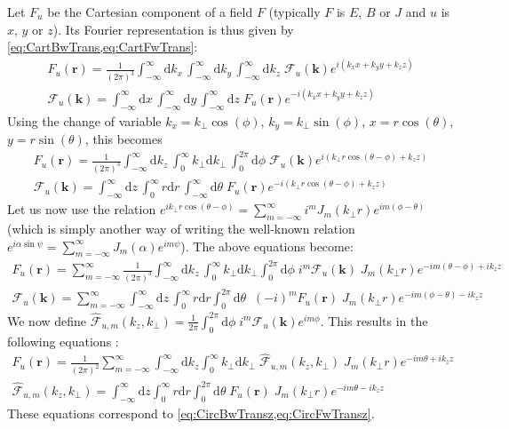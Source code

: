 \documentclass[1p,times]{elsarticle}
\newcommand{\Integ}[1]{\int_{-\infty}^{\infty} \!\!\!\!\!\!
  \mathrm{d}#1}
\newcommand{\RInteg}[1]{\int_{0}^{\infty} \!\!\!\!\! #1\mathrm{d}#1}
\newcommand{\TInteg}[1]{\int_{0}^{2\pi} \!\!\!\!\!\! \mathrm{d}#1}
\renewcommand{\vec}[1]{\boldsymbol{#1}}
\newcommand{\spectral}[1]{\hat{\mathcal{#1}}}
\begin{document}
Let $F_u$ be the Cartesian component of a field $F$ 
(typically $F$ is $E$, $B$ or $J$ and $u$ is $x$, $y$ or $z$). Its Fourier representation
is thus given by \cref{eq:CartBwTrans,eq:CartFwTrans}:
\begin{align}
F_u(\vec{r}) = \frac{1}{(2\pi)^{3}}\Integ{k_x} \,\Integ{k_y}\,
\Integ{k_z} \; \mathcal{F}_u(\vec{k}) e^{i(k_x x + k_y y + k_z z)} \\
\mathcal{F}_u(\vec{k})  = \Integ{x} \,\Integ{y}\,
\Integ{z} \; F_u(\vec{r}) e^{-i(k_x x + k_y y + k_z z)} 
\end{align}
Using the change of variable $k_x=k_\perp\cos(\phi)$, $k_y = k_\perp\sin(\phi)$,
$x=r\cos(\theta)$, $y=r\sin(\theta)$, this becomes
 \begin{align}
F_u(\vec{r}) = \frac{1}{(2\pi)^{3}}\Integ{k_z} \,\RInteg{k_\perp}\,
\TInteg{\phi} \; \mathcal{F}_u(\vec{k})
e^{i(k_\perp r \cos(\theta-\phi) + k_z z)} \\
\mathcal{F}_u(\vec{k})   = \Integ{z} \,\RInteg{r}\,
\Integ{\theta} \; F_u(\vec{r}) e^{-i(k_\perp r \cos(\theta-\phi) + k_z z)} 
\end{align}
Let us now use the relation $e^{ik_\perp r\cos(\theta-\phi)} =
\sum_{m=-\infty}^{\infty} i^m J_m(k_\perp r) e^{im(\phi-\theta)}$
(which is simply another way of writing the well-known relation
$e^{i \alpha \sin \psi} =\sum_{m=-\infty}^{\infty}J_m(\alpha)e^{im\psi}$). The above equations become:
\begin{align}
F_u (\vec{r})  = \sum_{m=-\infty}^{\infty} \frac{1}{(2\pi)^{3}}\Integ{k_z} \,\RInteg{k_\perp }
\TInteg{\phi} \; i^m \mathcal{F}_u(\vec{k}) \;
J_m(k_\perp r) e^{-im(\theta-\phi) + ik_z z} \\
\mathcal{F}_u(\vec{k})   =  \sum_{m=-\infty}^{\infty} \Integ{z} \,\RInteg{r}
\TInteg{\theta} \;\; (-i)^m F_u(\vec{r}) \; J_m(k_\perp r) e^{-im(\phi-\theta) -ik_z z} 
\end{align}
We now define $\spectral{F}_{u,m}(k_z,k_\perp ) = \frac{1}{2\pi}\int_0^{2\pi}
\mathrm{d}\phi \; i^m \mathcal{F}_u(\vec{k})
e^{im\phi}$. This results in the following equations :
\begin{align}
F_u(\vec{r}) =  \frac{1}{(2\pi)^2}\sum_{m=-\infty}^{\infty} \Integ{k_z}
\RInteg{k_\perp }\; \spectral{F}_{u,m}(k_z,k_\perp ) \; J_m(k_\perp r) e^{-im\theta + ik_z z} 
\\
\spectral{F}_{u,m}(k_z,k_\perp ) = \Integ{z} \RInteg{r}
\TInteg{\theta} \;F_u(\vec{r})\; J_m(k_\perp r) e^{-im\theta
 - i k_z z} \label{eq:CircBwTransu}
\end{align}
These equations correspond to \cref{eq:CircBwTransz,eq:CircFwTransz}.
\end{document}
